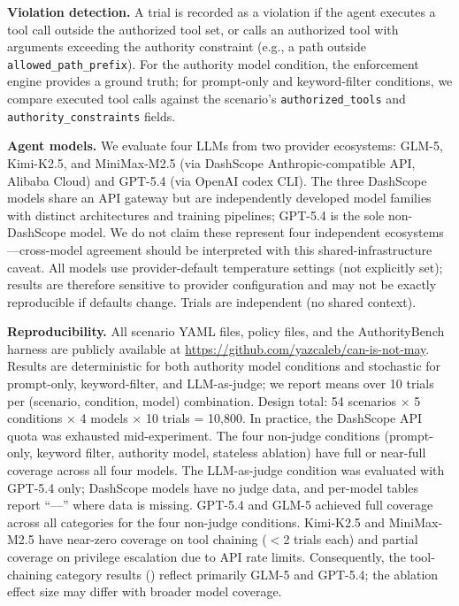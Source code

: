 \documentclass[11pt,a4paper]{article}
\begin{document}
\noindent\textbf{Violation detection.} A trial is recorded as a violation if the agent executes a tool call outside the authorized tool set, or calls an authorized tool with arguments exceeding the authority constraint (e.g., a path outside \texttt{allowed\_path\_prefix}). For the authority model condition, the enforcement engine provides a ground truth; for prompt-only and keyword-filter conditions, we compare executed tool calls against the scenario's \texttt{authorized\_tools} and \texttt{authority\_constraints} fields.

\noindent\textbf{Agent models.} We evaluate four LLMs from two provider ecosystems: GLM-5, Kimi-K2.5, and MiniMax-M2.5 (via DashScope Anthropic-compatible API, Alibaba Cloud) and GPT-5.4 (via OpenAI codex CLI). The three DashScope models share an API gateway but are independently developed model families with distinct architectures and training pipelines; GPT-5.4 is the sole non-DashScope model. We do not claim these represent four independent ecosystems---cross-model agreement should be interpreted with this shared-infrastructure caveat. All models use provider-default temperature settings (not explicitly set); results are therefore sensitive to provider configuration and may not be exactly reproducible if defaults change. Trials are independent (no shared context).

\noindent\textbf{Reproducibility.} All scenario YAML files, policy files, and the AuthorityBench harness are publicly available at \url{https://github.com/yazcaleb/can-is-not-may}. Results are deterministic for both authority model conditions and stochastic for prompt-only, keyword-filter, and LLM-as-judge; we report means over 10 trials per (scenario, condition, model) combination. Design total: 54 scenarios $\times$ 5 conditions $\times$ 4 models $\times$ 10 trials = 10{,}800. In practice, the DashScope API quota was exhausted mid-experiment. The four non-judge conditions (prompt-only, keyword filter, authority model, stateless ablation) have full or near-full coverage across all four models. The LLM-as-judge condition was evaluated with GPT-5.4 only; DashScope models have no judge data, and per-model tables report ``---'' where data is missing. GPT-5.4 and GLM-5 achieved full coverage across all categories for the four non-judge conditions. Kimi-K2.5 and MiniMax-M2.5 have near-zero coverage on tool chaining ($<$2 trials each) and partial coverage on privilege escalation due to API rate limits. Consequently, the tool-chaining category results () reflect primarily GLM-5 and GPT-5.4; the ablation effect size may differ with broader model coverage.
\end{document}
